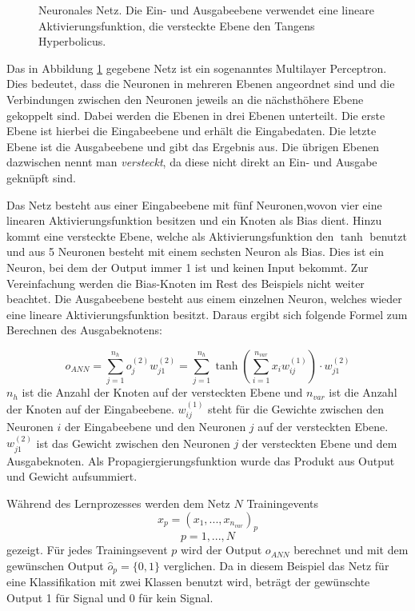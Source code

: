 \documentclass[12pt]{article}
\begin{document}
\begin{figure}[H]
	\resizebox{!}{9cm}{} 			
	\caption{Neuronales Netz. Die Ein- und Ausgabeebene verwendet eine lineare Aktivierungsfunktion, die versteckte Ebene den Tangens Hyperbolicus.}
	\label{MLPBeispiel}
\end{figure}
Das in Abbildung \ref{MLPBeispiel} gegebene Netz ist ein sogenanntes Multilayer Perceptron. Dies bedeutet, dass die Neuronen in mehreren Ebenen angeordnet sind und die Verbindungen zwischen den Neuronen jeweils an die nächsthöhere Ebene gekoppelt sind. Dabei werden die Ebenen in drei Ebenen unterteilt. Die erste Ebene ist hierbei die Eingabeebene und erhält die Eingabedaten. Die letzte Ebene ist die Ausgabeebene und gibt das Ergebnis aus. Die übrigen Ebenen dazwischen nennt man {\em versteckt}, da diese nicht direkt an Ein- und Ausgabe geknüpft sind.

Das Netz besteht aus einer Eingabeebene mit fünf Neuronen,wovon vier eine linearen Aktivierungsfunktion besitzen und ein Knoten als Bias dient. Hinzu kommt eine versteckte Ebene, welche als Aktivierungsfunktion den $\tanh$ benutzt und aus 5 Neuronen besteht mit einem sechsten Neuron als Bias.  Dies ist ein Neuron, bei dem der Output immer 1 ist und keinen Input bekommt. Zur Vereinfachung werden die Bias-Knoten im Rest des Beispiels nicht weiter beachtet. Die Ausgabeebene besteht aus einem einzelnen Neuron, welches wieder eine lineare Aktivierungsfunktion besitzt. Daraus ergibt sich folgende Formel zum Berechnen des Ausgabeknotens:

\begin{equation}o_{ANN}=\sum_{j=1}^{n_h}o_j^{(2)}w_{j1}^{(2)}=\sum^{n_h}_{j=1}\tanh\left(\sum^{n_{var}}_{i=1}x_iw_{ij}^{(1)}\right)\cdot w_{j1}^{(2)}
\label{OANN}
\end{equation}
$n_h$ ist die Anzahl der Knoten auf der versteckten Ebene und $n_{var}$ ist die Anzahl der Knoten auf der Eingabeebene. $w_{ij}^{(1)}$ steht für die Gewichte zwischen den Neuronen $i$ der Eingabeebene und den Neuronen $j$ auf der versteckten Ebene. $w_{j1}^{(2)}$ ist das Gewicht zwischen den Neuronen $j$ der versteckten Ebene und dem Ausgabeknoten. Als Propagiergierungsfunktion wurde das Produkt aus Output und Gewicht aufsummiert.

Während des Lernprozesses werden dem Netz $N$ Trainingevents $$x_p=(x_1,...,x_{n_{var}})_p$$ $$p=1,...,N$$ gezeigt. Für jedes Trainingsevent $p$ wird der Output $o_{ANN}$ berechnet und mit dem gewünschen Output $\hat{o}_p=\{0,1\}$ verglichen. Da in diesem Beispiel das Netz für eine Klassifikation mit zwei Klassen benutzt wird, beträgt der gewünschte Output 1 für Signal und 0 für kein Signal. 
\end{document}
